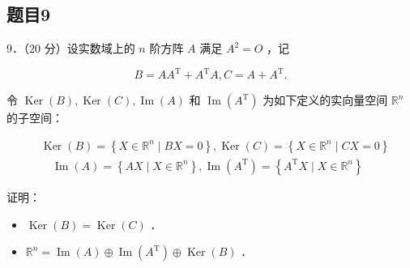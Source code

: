 \documentclass{article}
\begin{document}
\subsection{题目9}
9．（20 分）设实数域上的 \(n\) 阶方阵 \(A\) 满足 \(A^{2}=O\) ，记

\[
B=A A^{\mathrm{T}}+A^{\mathrm{T}} A, C=A+A^{\mathrm{T}} .
\]

令 \(\operatorname{Ker}(B), \operatorname{Ker}(C), \operatorname{Im}(A)\) 和 \(\operatorname{Im}\left(A^{\mathrm{T}}\right)\) 为如下定义的实向量空间 \(\mathbb{R}^{n}\) 的子空间：

\[
\begin{aligned}
& \operatorname{Ker}(B)=\left\{X \in \mathbb{R}^{n} \mid B X=0\right\}, \operatorname{Ker}(C)=\left\{X \in \mathbb{R}^{n} \mid C X=0\right\} \\
& \quad \operatorname{Im}(A)=\left\{A X \mid X \in \mathbb{R}^{n}\right\}, \operatorname{Im}\left(A^{\mathrm{T}}\right)=\left\{A^{\mathrm{T}} X \mid X \in \mathbb{R}^{n}\right\}
\end{aligned}
\]

证明：

\begin{itemize}
  \item[（1）] \(\operatorname{Ker}(B)=\operatorname{Ker}(C)\) ．
  \item[（2）] \(\mathbb{R}^{n}=\operatorname{Im}(A) \oplus \operatorname{Im}\left(A^{\mathrm{T}}\right) \oplus \operatorname{Ker}(B)\) ．
\end{itemize}
\end{document}
